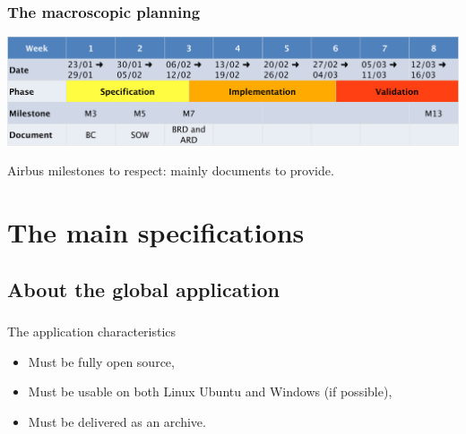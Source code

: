 \documentclass{beamer}
\begin{document}
\begin{frame}
	\frametitle{The macroscopic planning}

    \begin{center}
		\includegraphics[width=\textwidth]{planning}	
	\end{center}
	
		Airbus milestones to respect: mainly documents to provide.
	
\end{frame}



\section{The main specifications}

\subsection{About the global application}
\begin{frame}
	\frametitle{}
	 \begin{block}{The application characteristics}
		\begin{itemize}
			\item Must be fully open source,
			\item Must be usable on both Linux Ubuntu and Windows (if possible),
			\item Must be delivered as an archive.
		\end{itemize}
    \end{block}
\end{frame}
    
\end{document}
